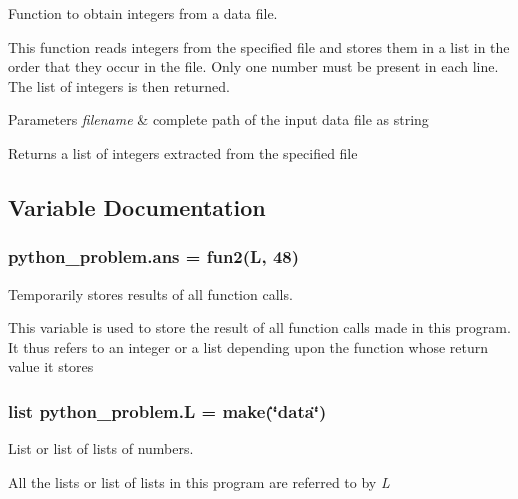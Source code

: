Function to obtain integers from a data file. 

This function reads integers from the specified file and stores them in a list in the order that they occur in the file. Only one number must be present in each line. The list of integers is then returned.


\begin{DoxyParams}{Parameters}
{\em filename} & complete path of the input data file as string \\
\hline
\end{DoxyParams}
\begin{DoxyReturn}{Returns}
a list of integers extracted from the specified file 
\end{DoxyReturn}


\subsection{Variable Documentation}
\subsubsection[{\texorpdfstring{ans}{ans}}]{\setlength{\rightskip}{0pt plus 5cm}python\+\_\+problem.\+ans = {\bf fun2}({\bf L}, 48)}\hypertarget{namespacepython__problem_ad1044e14fc75b912867e5caba3482203}{}\label{namespacepython__problem_ad1044e14fc75b912867e5caba3482203}


Temporarily stores results of all function calls. 

This variable is used to store the result of all function calls made in this program. It thus refers to an integer or a list depending upon the function whose return value it stores 
\subsubsection[{\texorpdfstring{L}{L}}]{\setlength{\rightskip}{0pt plus 5cm}list python\+\_\+problem.\+L = {\bf make}(\char`\"{}data\char`\"{})}\hypertarget{namespacepython__problem_a57cd50d64eeaf609bf3db7738032930d}{}\label{namespacepython__problem_a57cd50d64eeaf609bf3db7738032930d}


List or list of lists of numbers. 

All the lists or list of lists in this program are referred to by {\itshape L} 